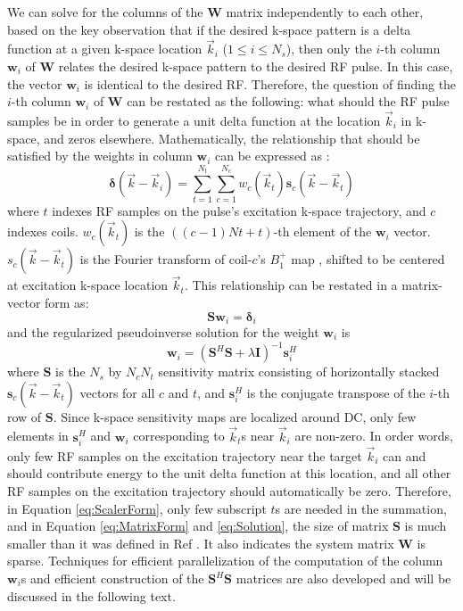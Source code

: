 \par We can solve for the columns of the $\mathbf{W}$ matrix independently to each other, based on the key observation that if the desired k-space pattern is a delta function at a given k-space location $\vec{k}_i$ ($1\leq i \leq N_s$), then only the $i$-th column $\mathbf{w}_i$ of $\mathbf{W}$ relates the desired k-space pattern to the desired RF pulse. In this case, the vector $\mathbf{w}_i$ is identical to the desired RF. Therefore, the question of finding the $i$-th column $\mathbf{w}_i$ of $\mathbf{W}$ can be restated as the following: what should the RF pulse samples be in order to generate a unit delta function at the location $\vec{k}_i$ in k-space, and zeros elsewhere. Mathematically, the relationship that should be satisfied by the weights in column $\mathbf{w}_i$  can be expressed as \cite{katscher2003transmit}:   
\begin{equation}\label{eq:ScalerForm}
\mathbf{\delta}(\vec{k}-\vec{k}_i)=\sum_{t=1}^{N_t}\sum_{c=1}^{N_c}w_c(\vec{k}_t)\mathbf{s}_c(\vec{k}-\vec{k}_t)
\end{equation}
where $t$ indexes RF samples on the pulse’s excitation k-space trajectory, and $c$ indexes coils. $w_c(\vec{k}_t)$ is the $((c-1)Nt+t)$-th element of the $\mathbf{w}_i$ vector. $s_c(\vec{k}-\vec{k}_t)$ is the Fourier transform of coil-$c$'s $B_1^+$ map , shifted to be centered at excitation k-space location $\vec{k}_t$. 
This relationship can be restated in a matrix-vector form as:                                       
\begin{equation}\label{eq:MatrixForm}
\mathbf{Sw}_i=\mathbf{\delta}_i
\end{equation}
and the regularized pseudoinverse solution for the weight $\mathbf{w}_i$ is                       
\begin{equation}\label{eq:Solution}
\mathbf{w}_i=\left( \mathbf{S}^{H} \mathbf{S} + \lambda \mathbf{I} \right) ^{-1} \mathbf{s}_i^{H}
\end{equation}
where $\mathbf{S}$ is the $N_s$ by $N_cN_t$ sensitivity matrix consisting of horizontally stacked $\mathbf{s}_c(\vec{k}-\vec{k}_t)$ vectors for all $c$ and $t$, and $\mathbf{s}_i^{H}$ is the conjugate transpose of the $i$-th row of $\mathbf{S}$. Since k-space sensitivity maps are localized around DC, only few elements in $\mathbf{s}_i^{H}$ and $\mathbf{w}_i$ corresponding to $\vec{k}_t$s near $\vec{k}_i$ are non-zero. In order words, only few RF samples on the excitation trajectory near the target $\vec{k}_i$ can and should contribute energy to the unit delta function at this location, and all other RF samples on the excitation trajectory should automatically be zero. Therefore, in Equation \ref{eq:ScalerForm}, only few subscript $t$s are needed in the summation, and in Equation \ref{eq:MatrixForm} and \ref{eq:Solution}, the size of matrix $\mathbf{S}$ is much smaller than it was defined in Ref \cite{katscher2003transmit}. It also indicates the system matrix $\mathbf{W}$ is sparse. Techniques for efficient parallelization of the computation of the column $\mathbf{w}_i$s and efficient construction of the $\mathbf{S}^{H}\mathbf{S}$ matrices are also developed and will be discussed in the following text.


